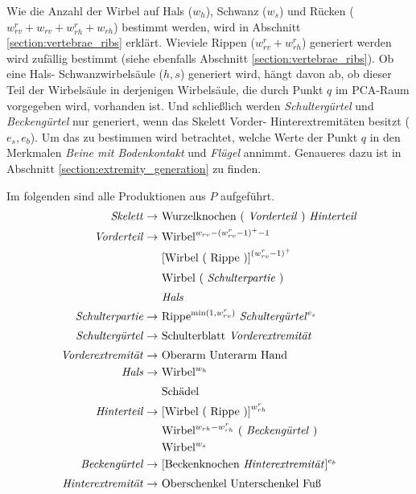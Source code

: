 Wie die Anzahl der Wirbel auf Hals ($w_h$), Schwanz ($w_s$) und Rücken ($w_{rv}^r + w_{rv} + w_{rh}^r + w_{rh}$) bestimmt werden, wird in Abschnitt \ref{section:vertebrae_ribs} erklärt.
Wieviele Rippen ($w_{rv}^r + w_{rh}^r$) generiert werden wird zufällig bestimmt (siehe ebenfalls Abschnitt \ref{section:vertebrae_ribs}).
Ob eine Hals- \bzw Schwanzwirbelsäule ($h, s$) generiert wird, hängt davon ab, ob dieser Teil der Wirbelsäule in derjenigen Wirbelsäule, die durch Punkt $q$ im PCA-Raum vorgegeben wird, vorhanden ist.
Und schließlich werden \emph{Schultergürtel} und \emph{Beckengürtel} nur generiert, wenn das Skelett Vorder- \bzw Hinterextremitäten besitzt ($e_s, e_b$). Um das zu bestimmen wird \ua betrachtet, welche Werte der Punkt $q$ in den Merkmalen \emph{Beine mit Bodenkontakt} und \emph{Flügel} annimmt. Genaueres dazu ist in Abschnitt \ref{section:extremity_generation} zu finden.

Im folgenden sind alle Produktionen aus $P$ aufgeführt.
\begin{align*}
 \text{\emph{Skelett}} \rightarrow &\text{ Wurzelknochen ( \emph{Vorderteil} ) \emph{Hinterteil}}\\
 \text{\emph{Vorderteil}} \rightarrow &\text{ Wirbel}^{w_{rv} - (w_{rv}^r - 1)^+ - 1}\\
    &\text{ [Wirbel ( Rippe )]}^{(w_{rv}^r - 1)^+}\\
    &\text{ Wirbel ( \emph{Schulterpartie} )}^{\vphantom{(}}\\
    &\text{ \emph{Hals}}^{\vphantom{(}}\\
 \text{\emph{Schulterpartie}} \rightarrow &\text{ Rippe$^{\text{min}(1,w_{rv}^r)}$ \emph{Schultergürtel}$^{e_s}$}\\ 
 \text{\emph{Schultergürtel}} \rightarrow &\text{ Schulterblatt \emph{Vorderextremität}}^{\vphantom{(}}\\
 \text{\emph{Vorderextremität}} \rightarrow &\text{ Oberarm Unterarm Hand}^{\vphantom{(}}\\
 \text{\emph{Hals}} \rightarrow &\text{ Wirbel$^{w_h}$}\\
    &\text{ Schädel}^{\vphantom{(}}\\
 \text{\emph{Hinterteil}} \rightarrow &\text{ [Wirbel ( Rippe )]}^{w_{rh}^r}\\
    &\text{ Wirbel$^{w_{rh} - w_{rh}^r}$ ( \emph{Beckengürtel} )}\\
    &\text{ Wirbel$^{w_s}$}\\
 \text{\emph{Beckengürtel}} \rightarrow &\text{ [Beckenknochen \emph{Hinterextremität}]$^{e_b}$}\\
 \text{\emph{Hinterextremität}} \rightarrow &\text{ Oberschenkel Unterschenkel Fuß}^{\vphantom{(}}
\end{align*}

